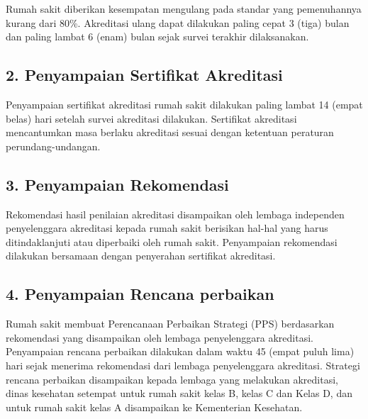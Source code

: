 \documentclass[
]{book}
\begin{document}
Rumah sakit diberikan kesempatan mengulang pada standar yang pemenuhannya kurang dari 80\%. Akreditasi ulang dapat dilakukan paling cepat 3 (tiga) bulan dan paling lambat 6 (enam) bulan sejak survei terakhir dilaksanakan.

\hypertarget{penyampaian-sertifikat-akreditasi}{%
\subsection*{2. Penyampaian Sertifikat Akreditasi}\label{penyampaian-sertifikat-akreditasi}}

Penyampaian sertifikat akreditasi rumah sakit dilakukan paling lambat 14 (empat belas) hari setelah survei akreditasi dilakukan. Sertifikat akreditasi mencantumkan masa berlaku akreditasi sesuai dengan ketentuan peraturan perundang-undangan.

\hypertarget{penyampaian-rekomendasi}{%
\subsection*{3. Penyampaian Rekomendasi}\label{penyampaian-rekomendasi}}

Rekomendasi hasil penilaian akreditasi disampaikan oleh lembaga independen penyelenggara akreditasi kepada rumah sakit berisikan hal-hal yang harus ditindaklanjuti atau diperbaiki oleh rumah sakit. Penyampaian rekomendasi dilakukan bersamaan dengan penyerahan sertifikat akreditasi.

\hypertarget{penyampaian-rencana-perbaikan}{%
\subsection*{4. Penyampaian Rencana perbaikan}\label{penyampaian-rencana-perbaikan}}

Rumah sakit membuat Perencanaan Perbaikan Strategi (PPS) berdasarkan rekomendasi yang disampaikan oleh lembaga penyelenggara akreditasi. Penyampaian rencana perbaikan dilakukan dalam waktu 45 (empat puluh lima) hari sejak menerima rekomendasi dari lembaga penyelenggara akreditasi. Strategi rencana perbaikan disampaikan kepada lembaga yang melakukan akreditasi, dinas kesehatan setempat untuk rumah sakit kelas B, kelas C dan Kelas D, dan untuk rumah sakit kelas A disampaikan ke Kementerian Kesehatan.
\end{document}
